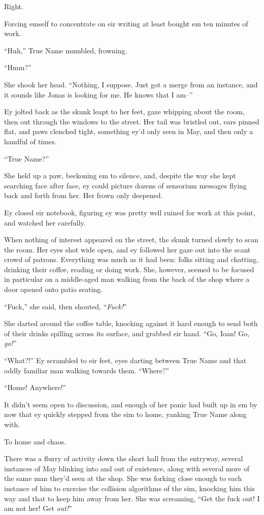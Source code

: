 Right.

Forcing emself to concentrate on eir writing at least bought em ten minutes of work.

``Huh,'' True Name mumbled, frowning.

``Hmm?''

She shook her head. ``Nothing, I suppose. Just got a merge from an instance, and it sounds like Jonas is looking for me. He knows that I am--''

Ey jolted back as the skunk leapt to her feet, gaze whipping about the room, then out through the windows to the street. Her tail was bristled out, ears pinned flat, and paws clenched tight, something ey'd only seen in May, and then only a handful of times.

``True Name?''

She held up a paw, beckoning em to silence, and, despite the way she kept searching face after face, ey could picture dozens of sensorium messages flying back and forth from her. Her frown only deepened.

Ey closed eir notebook, figuring ey was pretty well ruined for work at this point, and watched her carefully.

When nothing of interest appeared on the street, the skunk turned slowly to scan the room. Her eyes shot wide open, and ey followed her gaze out into the scant crowd of patrons. Everything was much as it had been: folks sitting and chatting, drinking their coffee, reading or doing work. She, however, seemed to be focused in particular on a middle-aged man walking from the back of the shop where a door opened onto patio seating.

``Fuck,'' she said, then shouted, ``\emph{Fuck!}''

She darted around the coffee table, knocking against it hard enough to send both of their drinks spilling across its surface, and grabbed eir hand. ``Go, Ioan! Go, \emph{go!}''

``What?!'' Ey scrambled to eir feet, eyes darting between True Name and that oddly familiar man walking towards them. ``Where?''

``Home! Anywhere!''

It didn't seem open to discussion, and enough of her panic had built up in em by now that ey quickly stepped from the sim to home, yanking True Name along with.

To home and chaos.

There was a flurry of activity down the short hall from the entryway, several instances of May blinking into and out of existence, along with several more of the same man they'd seen at the shop. She was forking close enough to each instance of him to exercise the collision algorithms of the sim, knocking him this way and that to keep him away from her. She was screaming, ``Get the fuck out! I am not her! Get \emph{out!}''


